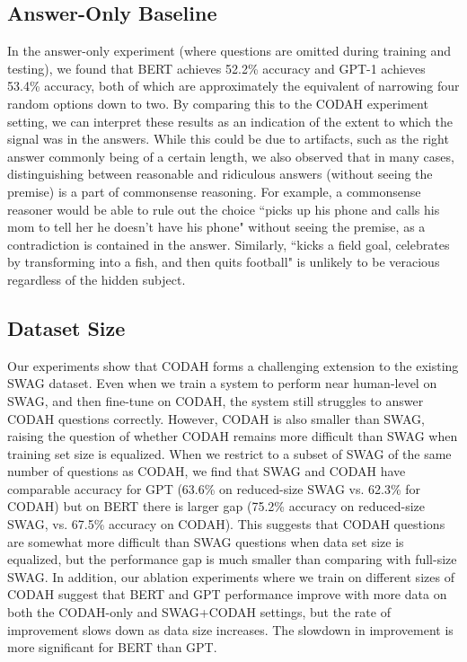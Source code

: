 \documentclass[11pt,a4paper]{article}
\begin{document}
    \subsection{Answer-Only Baseline}
    In the answer-only experiment (where questions are omitted during training and testing), we found that BERT achieves 52.2\% accuracy and GPT-1 achieves 53.4\% accuracy, both of which are approximately the equivalent of narrowing four random options down to two. By comparing this to the CODAH experiment setting, we can interpret these results as an indication of the extent to which the signal was in the answers. While this could be due to artifacts, such as the right answer commonly being of a certain length, we also observed that in many cases, distinguishing between reasonable and ridiculous answers (without seeing the premise) is a part of commonsense reasoning. For example, a commonsense reasoner would be able to rule out the choice ``picks up his phone and calls his mom to tell her he doesn't have his phone" without seeing the premise, as a contradiction is contained in the answer. Similarly, ``kicks a field goal, celebrates by transforming into a fish, and then quits football" is unlikely to be veracious regardless of the hidden subject. 
    
    \subsection{Dataset Size}
    Our experiments show that CODAH forms a challenging extension to the existing SWAG dataset. Even when we train a system to perform near human-level on SWAG, and then fine-tune on CODAH, the system still struggles to answer CODAH questions correctly. However, CODAH is also smaller than SWAG, raising the question of whether CODAH remains more difficult than SWAG when training set size is equalized.  When we restrict to a subset of SWAG of the same number of questions as CODAH, we find that SWAG and CODAH have comparable accuracy for GPT (63.6\% on reduced-size SWAG vs. 62.3\% for CODAH) but on BERT there is larger gap (75.2\% accuracy on reduced-size SWAG, vs. 67.5\% accuracy on CODAH).  This suggests that CODAH questions are somewhat more difficult than SWAG questions when data set size is equalized, but the performance gap is much smaller than comparing with full-size SWAG. In addition, our ablation experiments where we train on different sizes of CODAH suggest that BERT and GPT performance improve with more data on both the CODAH-only and SWAG+CODAH settings, but the rate of improvement slows down as data size increases. The slowdown in improvement is more significant for BERT than GPT.
    
\end{document}

